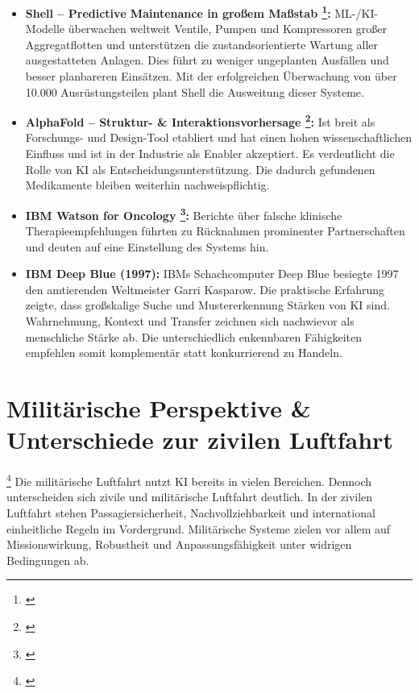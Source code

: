 \medskip
\begin{itemize}
  \item \textbf{Shell – Predictive Maintenance in großem Maßstab \footnote{ \parencite{shell-jpt-2022}}:}
    ML-/KI-Modelle überwachen weltweit Ventile, Pumpen und Kompressoren großer Aggregatflotten und unterstützen die
    zustandsorientierte Wartung aller ausgestatteten Anlagen. Dies führt zu weniger ungeplanten Ausfällen und besser planbareren Einsätzen.
    Mit der erfolgreichen Überwachung von über 10.000 Ausrüstungsteilen plant Shell die Ausweitung dieser Systeme.
  \item \textbf{AlphaFold – Struktur- \& Interaktionsvorhersage \footnote{ \parencite{alphafold-nature-2021}}:}
    Ist breit als Forschungs- und Design-Tool etabliert und hat einen hohen wissenschaftlichen Einfluss und ist in der Industrie als Enabler akzeptiert. 
    Es verdeutlicht die Rolle von KI als Entscheidungsunterstützung. 
    Die dadurch gefundenen Medikamente bleiben weiterhin nachweispflichtig.
  \item \textbf{IBM Watson for Oncology \footnote{ \parencite{stat-watson-2018}}:}
    Berichte über falsche klinische Therapieempfehlungen führten zu Rücknahmen prominenter Partnerschaften und deuten auf eine Einstellung des Systems hin.
  \item \textbf{IBM Deep Blue (1997):}
    IBMs Schachcomputer Deep Blue besiegte 1997 den amtierenden Weltmeister Garri Kasparow. 
    Die praktische Erfahrung zeigte, dass großskalige Suche und Mustererkennung Stärken von KI sind. 
    Wahrnehmung, Kontext und Transfer zeichnen sich nachwievor als menschliche Stärke ab.
    Die unterschiedlich enkennbaren Fähigkeiten empfehlen somit komplementär statt konkurrierend zu Handeln.
\end{itemize}



\section{Militärische Perspektive \& Unterschiede zur zivilen Luftfahrt}\label{sec:militaer-perspektive}

\footnote{ \parencite{mil-ai-standards-2024}}
Die militärische Luftfahrt nutzt KI bereits in vielen Bereichen. Dennoch unterscheiden 
sich zivile und militärische Luftfahrt deutlich. In der zivilen Luftfahrt stehen Passagiersicherheit, 
Nachvollziehbarkeit und international einheitliche Regeln im Vordergrund. 
Militärische Systeme zielen vor allem auf Missionswirkung, 
Robustheit und Anpassungsfähigkeit unter widrigen Bedingungen ab.

